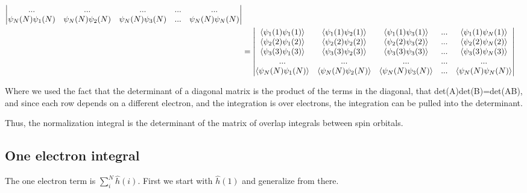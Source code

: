 \documentclass[a4paper]{article}
\begin{document}
\begin{equation}
\begin{aligned}
{\begin{vmatrix}
    ... & ... & ... & ...& ... \\
    \psi_N(N) \psi_1(N) &\psi_N(N) \psi_2(N) & \psi_N(N) \psi_3(N) &...& \psi_N(N)\psi_N(N)\\
    \end{vmatrix} } \\
        &= 
    \begin{vmatrix}  
     \Braket{\psi_1(1) \psi_1(1) }&  \Braket{\psi_1(1)\psi_2(1)}& \Braket{\psi_1(1)\psi_3(1) }& ... &  \Braket{\psi_1(1) \psi_N(1) }\\
     \Braket{\psi_2(2) \psi_1(2) }&  \Braket{\psi_2(2)\psi_2(2)} &  \Braket{\psi_2(2) \psi_3(2) }&...& \Braket{ \psi_2(2)\psi_N(2)} \\
     \Braket{\psi_3(3) \psi_1(3)} &  \Braket{\psi_3(3)\psi_2(3) }&  \Braket{\psi_3(3) \psi_3(3)} &...& \Braket{ \psi_3(3)\psi_N(3) }\\
    ... & ... & ... & ...& ... \\
    \Braket{ \psi_N(N) \psi_1(N) }& \Braket{\psi_N(N) \psi_2(N) }&  \Braket{\psi_N(N) \psi_3(N)} &...&  \Braket{\psi_N(N)\psi_N(N)}\\
    \end{vmatrix}  
    \label{deriv_overlap}
 \end{aligned}
 \end{equation}
 
 
 
 Where we used the fact that the determinant of a diagonal matrix is the product of the terms in the diagonal, that det(A)det(B)=det(AB), and since each row depends on a different electron, and the integration is over electrons, the integration can be pulled into the determinant.

Thus, the normalization integral is the determinant of the matrix of overlap integrals between spin orbitals.

\subsection{One electron integral}

The one electron term is $\displaystyle \sum_i^N\hat{h}(i)$. First we start with $\hat{h}(1)$ and generalize from there.
\end{document}
